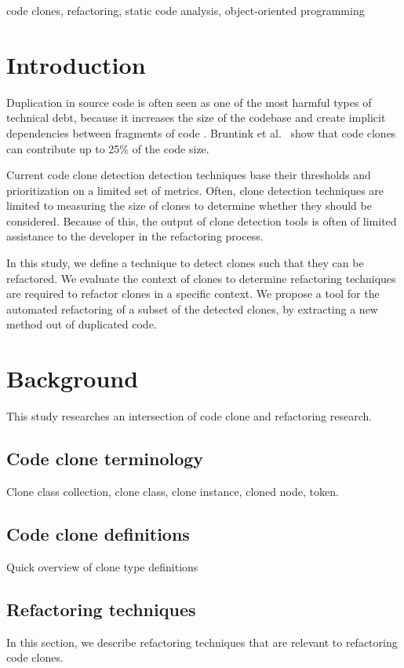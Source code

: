 \documentclass[conference]{IEEEtran}
\begin{document}
\begin{IEEEkeywords}
code clones, refactoring, static code analysis, object-oriented programming
\end{IEEEkeywords}

\section{Introduction}
Duplication in source code is often seen as one of the most harmful types of technical debt, because it increases the size of the codebase and create implicit dependencies between fragments of code \cite{ostberg2014automatically}. Bruntink et al.~\cite{bruntink2005use} show that code clones can contribute up to 25\% of the code size.

Current code clone detection detection techniques base their thresholds and prioritization on a limited set of metrics. Often, clone detection techniques are limited to measuring the size of clones to determine whether they should be considered. Because of this, the output of clone detection tools is often of limited assistance to the developer in the refactoring process.

In this study, we define a technique to detect clones such that they can be refactored. We evaluate the context of clones to determine refactoring techniques are required to refactor clones in a specific context. We propose a tool for the automated refactoring of a subset of the detected clones, by extracting a new method out of duplicated code.

\section{Background}
This study researches an intersection of code clone and refactoring research.

\subsection{Code clone terminology}
Clone class collection, clone class, clone instance, cloned node, token.

\subsection{Code clone definitions}
Quick overview of clone type definitions

\subsection{Refactoring techniques}
In this section, we describe refactoring techniques that are relevant to refactoring code clones.
\end{document}
